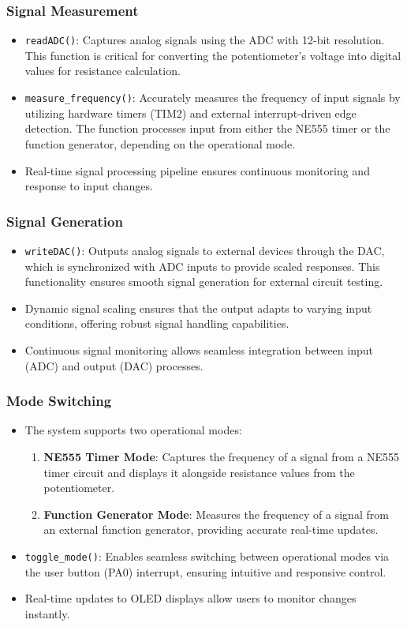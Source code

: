 \subsubsection{Signal Measurement}
\begin{itemize}
    \item \texttt{readADC()}: Captures analog signals using the ADC with 12-bit resolution. This function is critical for converting the potentiometer's voltage into digital values for resistance calculation.
    \item \texttt{measure\_frequency()}: Accurately measures the frequency of input signals by utilizing hardware timers (TIM2) and external interrupt-driven edge detection. The function processes input from either the NE555 timer or the function generator, depending on the operational mode.
    \item Real-time signal processing pipeline ensures continuous monitoring and response to input changes.
\end{itemize}

\subsubsection{Signal Generation}
\begin{itemize}
    \item \texttt{writeDAC()}: Outputs analog signals to external devices through the DAC, which is synchronized with ADC inputs to provide scaled responses. This functionality ensures smooth signal generation for external circuit testing.
    \item Dynamic signal scaling ensures that the output adapts to varying input conditions, offering robust signal handling capabilities.
    \item Continuous signal monitoring allows seamless integration between input (ADC) and output (DAC) processes.
\end{itemize}

\subsubsection{Mode Switching}
\begin{itemize}
    \item The system supports two operational modes:
        \begin{enumerate}
            \item \textbf{NE555 Timer Mode}: Captures the frequency of a signal from a NE555 timer circuit and displays it alongside resistance values from the potentiometer.
            \item \textbf{Function Generator Mode}: Measures the frequency of a signal from an external function generator, providing accurate real-time updates.
        \end{enumerate}
    \item \texttt{toggle\_mode()}: Enables seamless switching between operational modes via the user button (PA0) interrupt, ensuring intuitive and responsive control.
    \item Real-time updates to OLED displays allow users to monitor changes instantly.
\end{itemize}

